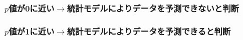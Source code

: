 \subsubsection{$p$値が0に近い$\rightarrow$統計モデルによりデータを予測できないと判断}

\subsubsection{$p$値が1に近い$\rightarrow$統計モデルによりデータを予測できると判断}

